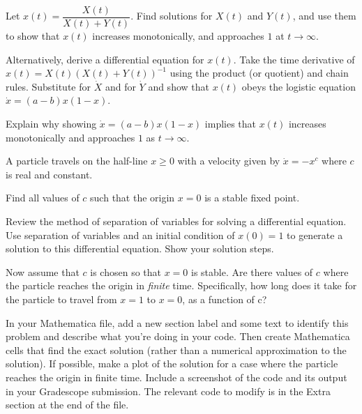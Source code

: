 \documentclass[12pt,letterpaper,noanswers]{exam}
\begin{document}
\begin{questions}
\begin{parts}
\item Let $x(t) = \dfrac{X(t)}{X(t)+Y(t)}$.  Find solutions for $X(t)$ and $Y(t)$, and use them to show that $x(t)$ increases monotonically, and approaches $1$ at $t\rightarrow\infty$.
\item Alternatively, derive a differential equation for $x(t)$.  Take the time derivative of $x(t) = X(t)(X(t)+Y(t))^{-1}$ using the product (or quotient) and chain rules.  Substitute for $\dot X$ and for $\dot Y$ and show that $x(t)$ obeys the logistic equation $\dot x = (a-b)x(1-x)$.
\item Explain why showing $\dot x = (a-b)x(1-x)$ implies that $x(t)$ increases monotonically and approaches $1$ as $t\rightarrow \infty$.
\end{parts}

\question A particle travels on the half-line $x\geq 0$ with a velocity given by $\dot x = -x^c$ where $c$ is real and constant.
\begin{parts}
\item Find all values of $c$ such that the origin $x = 0$ is a stable fixed point.
\item Review the method of separation of variables for solving a differential equation.  Use separation of variables and an initial condition of $x(0) = 1$ to generate a solution to this differential equation.  Show your solution steps.
\item Now assume that $c$ is chosen so that $x = 0$ is stable.  Are there values of $c$ where the particle reaches the origin in \emph{finite} time. Specifically, how long does it take for the particle to travel from $x=1$ to $x=0$, as a function of c?
\item In your Mathematica file, add a new section label and some text to identify this problem and describe what you're doing in your code.  Then create Mathematica cells that find the exact solution (rather than a numerical approximation to the solution).  If possible, make a plot of the solution for a case where the particle reaches the origin in finite time.  Include a screenshot of the code and its output in your Gradescope submission.  The relevant code to modify is in the Extra section at the end of the file.
\end{parts}


\end{questions}
\end{document}
